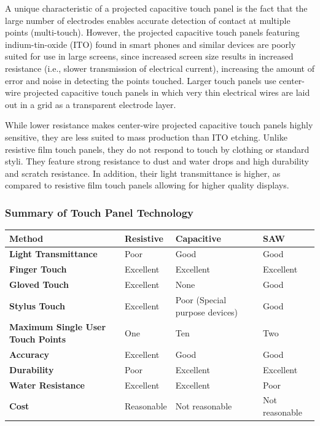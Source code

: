 \documentclass[11pt]{report}
\begin{document}
A unique characteristic of a projected capacitive touch panel is the fact that the large number of electrodes enables accurate detection of contact at multiple points (multi-touch). 
However, the projected capacitive touch panels featuring indium-tin-oxide (ITO) found in smart phones and similar devices are poorly suited for use in large screens, since increased screen size results in increased resistance (i.e., slower transmission of electrical current), increasing the amount of error and noise in detecting the points touched.
Larger touch panels use center-wire projected capacitive touch panels in which very thin electrical wires are laid out in a grid as a transparent electrode layer.
 
While lower resistance makes center-wire projected capacitive touch panels highly sensitive, they are less suited to mass production than ITO etching.
Unlike resistive film touch panels, they do not respond to touch by clothing or standard styli.
They feature strong resistance to dust and water drops and high durability and scratch resistance. 
In addition, their light transmittance is higher, as compared to resistive film touch panels allowing for higher quality displays.



\subsubsection{Summary of Touch Panel Technology}

\begin{center}
\begin{tabular}{| p{5cm} | l | p{4cm} | l |}
\hline
\textbf{Method} & \textbf{Resistive} & \textbf{Capacitive} & \textbf{SAW} \\ \hline
\textbf{Light Transmittance} & Poor & Good & Good \\ \hline
\textbf{Finger Touch} & Excellent & Excellent & Excellent \\ \hline
\textbf{Gloved Touch} & Excellent & None & Good \\ \hline
\textbf{Stylus Touch} & Excellent & Poor (Special purpose devices) & Good \\ \hline
\textbf{Maximum Single User Touch Points} & One & Ten & Two \\ \hline
\textbf{Accuracy} & Excellent & Good & Good \\ \hline
\textbf{Durability} & Poor & Excellent & Excellent \\ \hline
\textbf{Water Resistance} & Excellent & Excellent & Poor \\ \hline
\textbf{Cost} & Reasonable & Not reasonable & Not reasonable \\ \hline
\end{tabular}
\end{center}
\end{document}
